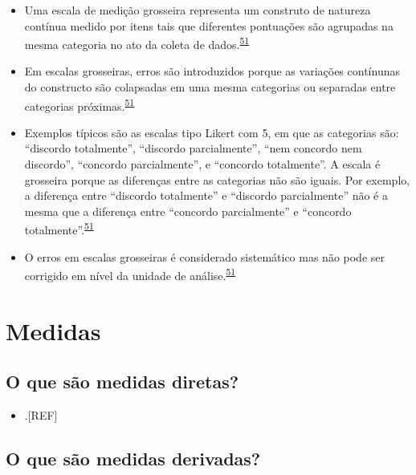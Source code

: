 \documentclass[
  a4paper,
]{book}
\providecommand{\tightlist}{%
  \setlength{\itemsep}{0pt}\setlength{\parskip}{0pt}}
\begin{document}
\begin{itemize}
\item
  Uma escala de medição grosseira representa um construto de natureza contínua medido por itens tais que diferentes pontuações são agrupadas na mesma categoria no ato da coleta de dados.\textsuperscript{\protect\hyperlink{ref-aguinis2008}{51}}
\item
  Em escalas grosseiras, erros são introduzidos porque as variações contínunas do constructo são colapsadas em uma mesma categorias ou separadas entre categorias próximas.\textsuperscript{\protect\hyperlink{ref-aguinis2008}{51}}
\item
  Exemplos típicos são as escalas tipo Likert com 5, em que as categorias são: ``discordo totalmente'', ``discordo parcialmente'', ``nem concordo nem discordo'', ``concordo parcialmente'', e ``concordo totalmente''. A escala é grosseira porque as diferenças entre as categorias não são iguais. Por exemplo, a diferença entre ``discordo totalmente'' e ``discordo parcialmente'' não é a mesma que a diferença entre ``concordo parcialmente'' e ``concordo totalmente''.\textsuperscript{\protect\hyperlink{ref-aguinis2008}{51}}
\item
  O erros em escalas grosseiras é considerado sistemático mas não pode ser corrigido em nível da unidade de análise.\textsuperscript{\protect\hyperlink{ref-aguinis2008}{51}}
\end{itemize}

\hypertarget{medidas}{%
\section{Medidas}\label{medidas}}

\hypertarget{o-que-suxe3o-medidas-diretas}{%
\subsection{O que são medidas diretas?}\label{o-que-suxe3o-medidas-diretas}}

\begin{itemize}
\tightlist
\item
  .{[}REF{]}
\end{itemize}

\hypertarget{o-que-suxe3o-medidas-derivadas}{%
\subsection{O que são medidas derivadas?}\label{o-que-suxe3o-medidas-derivadas}}
\end{document}
